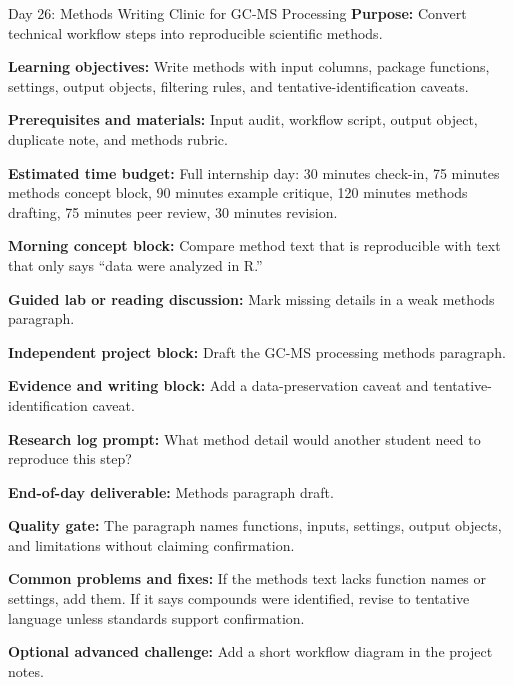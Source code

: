 \begin{dailybox}{Day 26: Methods Writing Clinic for GC-MS Processing}
\textbf{Purpose:} Convert technical workflow steps into reproducible scientific methods.

\textbf{Learning objectives:} Write methods with input columns, package functions, settings, output objects, filtering rules, and tentative-identification caveats.

\textbf{Prerequisites and materials:} Input audit, workflow script, output object, duplicate note, and methods rubric.

\textbf{Estimated time budget:} Full internship day: 30 minutes check-in, 75 minutes methods concept block, 90 minutes example critique, 120 minutes methods drafting, 75 minutes peer review, 30 minutes revision.

\textbf{Morning concept block:} Compare method text that is reproducible with text that only says ``data were analyzed in R.''

\textbf{Guided lab or reading discussion:} Mark missing details in a weak methods paragraph.

\textbf{Independent project block:} Draft the GC-MS processing methods paragraph.

\textbf{Evidence and writing block:} Add a data-preservation caveat and tentative-identification caveat.

\textbf{Research log prompt:} What method detail would another student need to reproduce this step?

\textbf{End-of-day deliverable:} Methods paragraph draft.

\textbf{Quality gate:} The paragraph names functions, inputs, settings, output objects, and limitations without claiming confirmation.

\textbf{Common problems and fixes:} If the methods text lacks function names or settings, add them. If it says compounds were identified, revise to tentative language unless standards support confirmation.

\textbf{Optional advanced challenge:} Add a short workflow diagram in the project notes.
\end{dailybox}

